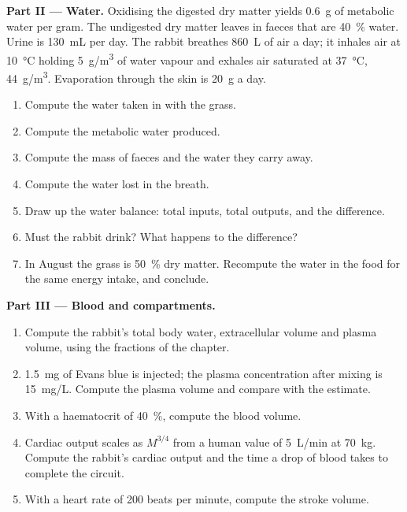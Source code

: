 \begin{problem}
\medskip
\noindent\textbf{Part II --- Water.}
Oxidising the digested dry matter yields \qty{0.6}{g} of metabolic
water per gram. The undigested dry matter leaves in faeces that are
\qty{40}{\%} water. Urine is \qty{130}{mL} per day. The rabbit breathes
\qty{860}{L} of air a day; it inhales air at \qty{10}{\celsius} holding
\qty{5}{g/m^3} of water vapour and exhales air saturated at
\qty{37}{\celsius}, \qty{44}{g/m^3}. Evaporation through the skin is
\qty{20}{g} a day.
\begin{enumerate}[resume]
  \item Compute the water taken in with the grass.
  \item Compute the metabolic water produced.
  \item Compute the mass of faeces and the water they carry away.
  \item Compute the water lost in the breath.
  \item Draw up the water balance: total inputs, total outputs, and
        the difference.
  \item Must the rabbit drink? What happens to the difference?
  \item In August the grass is \qty{50}{\%} dry matter. Recompute the
        water in the food for the same energy intake, and conclude.
\end{enumerate}

\medskip
\noindent\textbf{Part III --- Blood and compartments.}
\begin{enumerate}[resume]
  \item Compute the rabbit's total body water, extracellular volume and
        plasma volume, using the fractions of the chapter.
  \item \qty{1.5}{mg} of Evans blue is injected; the plasma
        concentration after mixing is \qty{15}{mg/L}. Compute the
        plasma volume and compare with the estimate.
  \item With a haematocrit of \qty{40}{\%}, compute the blood volume.
  \item Cardiac output scales as $M^{3/4}$ from a human value of
        \qty{5}{L/min} at \qty{70}{kg}. Compute the rabbit's cardiac
        output and the time a drop of blood takes to complete the
        circuit.
  \item With a heart rate of \qty{200}{} beats per minute, compute the
        stroke volume.
\end{enumerate}


\end{problem}
